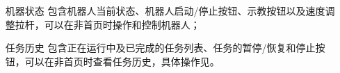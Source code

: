 \begin{itemize}[leftmargin=4.5em]
	\item [机器状态] 包含机器人当前状态、机器人启动/停止按钮、示教按钮以及速度调整拉杆，可以在非首页时操作和控制机器人；
	\item [任务历史] 包含正在运行中及已完成的任务列表、任务的暂停/恢复和停止按钮，可以在非首页时查看任务历史，具体操作见。
\end{itemize}

